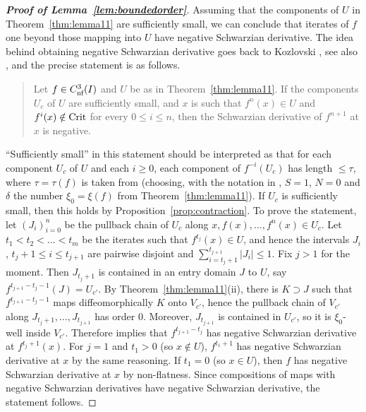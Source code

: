 \documentclass[12pt, psamsfonts, reqno]{amsart}
\begin{document}
\begin{proof}[\textbf{Proof of Lemma~\ref{lem:boundedorder}}]
Assuming that the components of $U$ in Theorem~\ref{thm:lemma11}
are sufficiently small, we can conclude that iterates of $f$ one
beyond those mapping into $U$ have negative Schwarzian derivative.
The idea behind obtaining negative Schwarzian derivative goes back
to Kozlovski \cite{Koz}, see also \cite{GSS}, and the precise
statement is as follows.
\begin{quote}
Let $f\in {C^3_{\text{\rm nf}}}(I)$ and $U$ be as in Theorem~\ref{thm:lemma11}.
If the components $U_c$ of $U$ are sufficiently small, and $x$ is
such that $f^n(x)\in U$ and $f^i(x)\notin {\mathop{\rm Crit}\nolimits}$ for every $0\leq
i\leq n$, then the Schwarzian derivative of $f^{n+1}$ at $x$ is
negative.
\end{quote}
``Sufficiently small'' in this statement should be interpreted as
that for each component $U_c$ of $U$ and each $i \geq 0$, each
component of $f^{-i}(U_c)$ has length $\leq \tau$, where
$\tau=\tau(f)$ is taken from \cite[Proposition~3]{vSV} (choosing,
with the notation in \cite[Proposition~3]{vSV}, $S=1$, $N=0$ and
$\delta$ the number $\xi_0=\xi(f)$ from
Theorem~\ref{thm:lemma11}). If $U_c$ is sufficiently small, then
this holds by Proposition~\ref{prop:contraction}. To prove the
statement, let $(J_i)_{i=0}^n$ be the pullback chain of $U_c$
along $x, f(x), \dots, f^n(x) \in U_c$. Let $t_1 < t_2 < \dots <
t_m$ be the iterates such that $f^{t_j}(x) \in U$, and hence the
intervals $J_i$, $t_j+1 \leq i \leq t_{j+1}$ are pairwise disjoint
and $\sum_{i=t_j+1}^{t_{j+1}} |J_i| \leq 1$. Fix $j>1$ for the
moment. Then $J_{t_j+1}$ is contained in an entry domain $J$ to
$U$, say $f^{t_{j+1}-t_j-1}(J)=U_{c'}$. By
Theorem~\ref{thm:lemma11}(ii), there is $K\supset J$ such that
$f^{t_{j+1}-t_j-1}$ maps diffeomorphically $K$ onto $V_{c'}$,
hence the pullback chain of $V_{c'}$ along $J_{t_j+1}, \ldots,
J_{t_{j+1}}$ has order $0$. Moreover, $J_{t_{j+1}}$ is contained
in $U_{c'}$, so it is $\xi_0$-well inside $V_{c'}$.
Therefore \cite[Proposition~3]{vSV}
implies that $f^{t_{j+1} - t_j}$ has negative Schwarzian
derivative at $f^{t_j+1}(x)$. For $j = 1$ and $t_1 > 0$ (so $x
\notin U$), $f^{t_1+1}$ has negative Schwarzian derivative at $x$
by the same reasoning. If $t_1 = 0$ (so $x \in U$), then $f$ has
negative Schwarzian derivative at $x$ by non-flatness. Since
compositions of maps with negative Schwarzian derivatives have
negative Schwarzian derivative, the statement follows.


\end{proof}
\end{document}
